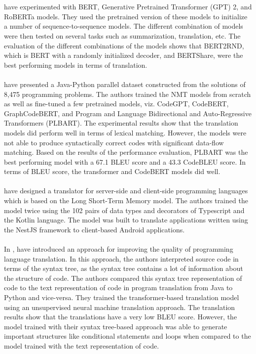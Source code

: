 \\\\
\textcite{rothe2020leveraging} have experimented with BERT, Generative Pretrained Transformer (GPT) 2, and RoBERTa models. They used the pretrained version of these models to initialize a number of sequence-to-sequence models. The different combination of models were then tested on several tasks such as summarization, translation, etc. The evaluation of the different combinations of the models shows that BERT2RND, which is BERT with a randomly initialized decoder, and BERTShare, were the best performing models in terms of translation.
\\\\
\textcite{ahmad2021avatar} have presented a Java-Python parallel dataset constructed from the solutions of 8,475 programming problems. The authors trained the NMT models from scratch as well as fine-tuned a few pretrained models, viz. CodeGPT, CodeBERT, GraphCodeBERT, and Program and Language Bidirectional and Auto-Regressive Transformers (PLBART). The experimental results show that the translation models did perform well in terms of lexical matching. However, the models were not able to produce syntactically correct codes with significant data-flow matching. Based on the results of the performance evaluation, PLBART was the best performing model with a 67.1 BLEU score and a 43.3 CodeBLEU score. In terms of BLEU score, the transformer and CodeBERT models did well.
\\\\
\textcite{tauda2021programming} have designed a translator for server-side and client-side programming languages which is based on the Long Short-Term Memory model. The authors trained the model twice using the 102 pairs of data types and decorators of Typescript and the Kotlin language. The model was built to translate applications written using the NestJS framework to client-based Android applications.
\\\\
In \cite{daiattempts}, \citeauthor{daiattempts} have introduced an approach for improving the quality of programming language translation. In this approach, the authors interpreted source code in terms of the syntax tree, as the syntax tree contains a lot of information about the structure of code. The authors compared this syntax tree representation of code to the text representation of code in program translation from Java to Python and vice-versa. They trained the transformer-based translation model using an unsupervised neural machine translation approach. The translation results show that the translations have a very low BLEU score. However, the model trained with their syntax tree-based approach was able to generate important structures like conditional statements and loops when compared to the model trained with the text representation of code.

